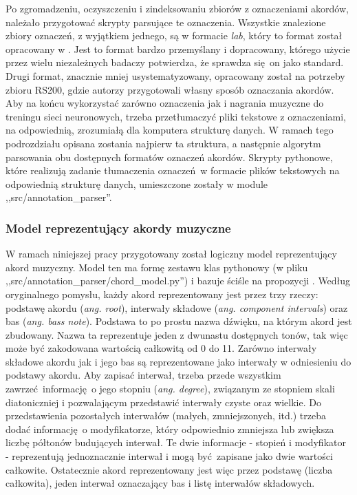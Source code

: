 Po zgromadzeniu, oczyszczeniu i zindeksowaniu zbiorów z oznaczeniami akordów, należało przygotować
skrypty parsujące te oznaczenia. Wszystkie znalezione zbiory oznaczeń, z wyjątkiem jednego, są w
formacie \emph{lab}, który to format został opracowany w \cite{harte_towards_nodate}. Jest to format
bardzo przemyślany i dopracowany, którego użycie przez wielu niezależnych badaczy potwierdza, że
sprawdza się on jako standard. Drugi format, znacznie mniej usystematyzowany, opracowany został na
potrzeby zbioru RS200, gdzie autorzy przygotowali własny sposób oznaczania akordów. Aby na końcu
wykorzystać zarówno oznaczenia jak i nagrania muzyczne do treningu sieci neuronowych, trzeba
przetłumaczyć pliki tekstowe z oznaczeniami, na odpowiednią, zrozumiałą dla komputera strukturę
danych. W ramach tego podrozdziału opisana zostania najpierw ta struktura, a następnie algorytm
parsowania obu dostępnych formatów oznaczeń akordów. Skrypty pythonowe, które realizują zadanie
tłumaczenia oznaczeń w formacie plików tekstowych na odpowiednią strukturę danych, umieszczone
zostały w module ,,src/annotation\_parser''.

\subsubsection{Model reprezentujący akordy muzyczne}

W ramach niniejszej pracy przygotowany został logiczny model reprezentujący akord muzyczny. Model
ten ma formę zestawu klas pythonowy (w pliku ,,src/annotation\_parser/chord\_model.py'') i bazuje
ściśle na propozycji \cite{harte_towards_nodate}.  Według oryginalnego pomysłu, każdy akord
reprezentowany jest przez trzy rzeczy: podstawę akordu (\emph{ang. root}), interwały składowe
(\emph{ang. component intervals}) oraz bas (\emph{ang. bass note}). Podstawa to po prostu nazwa
dźwięku, na którym akord jest zbudowany. Nazwa ta reprezentuje jeden z dwunastu dostępnych tonów,
tak więc może być zakodowana wartością całkowitą od 0 do 11. Zarówno interwały składowe akordu jak
i jego bas są reprezentowane jako interwały w odniesieniu do podstawy akordu. Aby zapisać interwał,
trzeba przede wszystkim zawrzeć informację o jego stopniu (\emph{ang. degree}), związanym ze
stopniem skali diatoniczniej i pozwalającym przedstawić interwały czyste oraz wielkie. Do
przedstawienia pozostałych interwałów (małych, zmniejszonych, itd.) trzeba dodać informację o
modyfikatorze, który odpowiednio zmniejsza lub zwiększa liczbę półtonów budujących interwał. Te dwie
informacje - stopień i modyfikator - reprezentują jednoznacznie interwał i mogą być zapisane jako
dwie wartości całkowite. Ostatecznie akord reprezentowany jest więc przez podstawę (liczba
całkowita), jeden interwał oznaczający bas i listę interwałów składowych.

